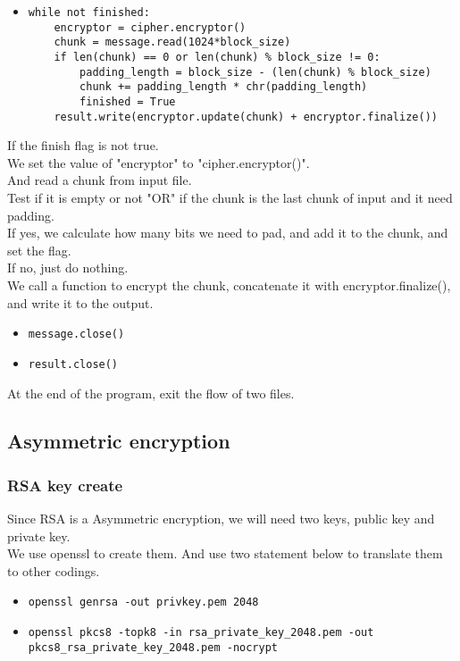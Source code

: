 \documentclass{article}
\begin{document}
\begin{itemize}
\item \begin{verbatim}while not finished:
    encryptor = cipher.encryptor()
    chunk = message.read(1024*block_size)
    if len(chunk) == 0 or len(chunk) % block_size != 0:
        padding_length = block_size - (len(chunk) % block_size)
        chunk += padding_length * chr(padding_length)
        finished = True
    result.write(encryptor.update(chunk) + encryptor.finalize())
\end{verbatim}
\end{itemize}

\noindent If the finish flag is not true.\\
We set the value of "encryptor" to "cipher.encryptor()".\\
And read a chunk from input file.\\
Test if it is empty or not "OR" if the chunk is the last chunk of input and it need padding.\\
If yes, we calculate how many bits we need to pad, and add it to the chunk, and set the flag.\\
If no, just do nothing.\\
We call a function to encrypt the chunk, concatenate it with encryptor.finalize(), and write it to the output.

\begin{itemize}
\item \verb|message.close()|
\item \verb|result.close()|
\end{itemize}

\noindent At the end of the program, exit the flow of two files.\\

\subsection{Asymmetric encryption}

\subsubsection{RSA key create}

\noindent Since RSA is a Asymmetric encryption, we will need two keys, public key and private key.\\
We use openssl to create them. And use two statement below to translate them to other codings.
\begin{itemize}
\item \verb|openssl genrsa -out privkey.pem 2048|
\item \verb|openssl pkcs8 -topk8 -in rsa_private_key_2048.pem -out pkcs8_rsa_private_key_2048.pem -nocrypt|
\end{itemize}
\end{document}
